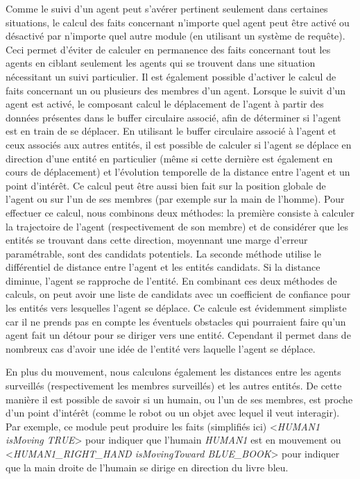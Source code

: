 \documentclass[a4paper,11pt,twoside]{StyleThese}
\begin{document}
Comme le suivi d'un agent peut s'avérer pertinent seulement dans certaines situations, le calcul des faits concernant n'importe quel agent peut être activé ou désactivé par n'importe quel autre module (en utilisant un système de requête). Ceci permet d'éviter de calculer en permanence des faits concernant tout les agents en ciblant seulement les agents qui se trouvent dans une situation nécessitant un suivi particulier.
Il est également possible d'activer le calcul de faits concernant un ou plusieurs des membres d'un agent. Lorsque le suivit d'un agent est activé, le composant calcul le déplacement de l'agent à partir des données présentes dans le buffer circulaire associé, afin de déterminer si l'agent est en train de se déplacer. En utilisant le buffer circulaire associé à l'agent et ceux associés aux autres entités, il est possible de calculer si l'agent se déplace en direction d'une entité en particulier (même si cette dernière est également en cours de déplacement) et l'évolution temporelle de la distance entre l'agent et un point d'intérêt. Ce calcul peut être aussi bien fait sur la position globale de l'agent ou sur l'un de ses membres (par exemple sur la main de l'homme).
Pour effectuer ce calcul, nous combinons deux méthodes: la première consiste à calculer la trajectoire de l'agent (respectivement de son membre) et de considérer que les entités se trouvant dans cette direction, moyennant une marge d'erreur paramétrable, sont des candidats potentiels. La seconde méthode utilise le différentiel de distance entre l'agent et les entités candidats. Si la distance diminue, l'agent se rapproche de l'entité. En combinant ces deux méthodes de calculs, on peut avoir une liste de candidats avec un coefficient de confiance pour les entités vers lesquelles l'agent se déplace. Ce calcule est évidemment simpliste car il ne prends pas en compte les éventuels obstacles qui pourraient faire qu'un agent fait un détour pour se diriger vers une entité. Cependant il permet dans de nombreux cas d'avoir une idée de l'entité vers laquelle l'agent se déplace.

En plus du mouvement, nous calculons également les distances entre les agents surveillés (respectivement les membres surveillés) et les autres entités.
De cette manière il est possible de savoir si un humain, ou l'un de ses membres, est proche d'un point d'intérêt (comme le robot ou un objet avec lequel il veut interagir).
Par exemple, ce module peut produire les faits (simplifiés ici) <\textit{HUMAN1 isMoving TRUE}> pour indiquer que l'humain \textit{HUMAN1} est en mouvement ou <\textit{HUMAN1\_RIGHT\_HAND isMovingToward BLUE\_BOOK}> pour indiquer que la main droite de l'humain se dirige en direction du livre bleu.
\end{document}
